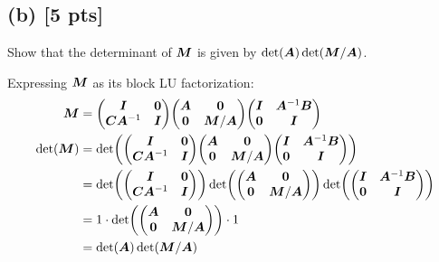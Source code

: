 \documentclass[twoside,10pt]{article}
\begin{document}
\subsection*{(b) [5 pts]} 
  Show that the determinant of $\bm{M}$ is given by $\det\left(\mtx{A}\right) \det\left(\mtx{M} / \mtx{A}\right)$.

  \quad Expressing $\bm{M}$ as its block LU factorization:
\begin{align*}
  \mtx{M} &= 
  \begin{pmatrix}
    \mtx{I} & \mtx{0} \\
    \mtx{C} \mtx{A}^{-1} & \mtx{I}
  \end{pmatrix}
  \begin{pmatrix}
    \mtx{A} & \mtx{0} \\
    \mtx{0} & \mtx{M} / \mtx{A}
  \end{pmatrix}
  \begin{pmatrix}
    \mtx{I} & \mtx{A}^{-1} \mtx{B} \\
    \mtx{0} & \mtx{I}
  \end{pmatrix}\\
  \det(\mtx{M}) &= 
  \det\left(\begin{pmatrix}
    \mtx{I} & \mtx{0} \\
    \mtx{C} \mtx{A}^{-1} & \mtx{I}
  \end{pmatrix}
  \begin{pmatrix}
    \mtx{A} & \mtx{0} \\
    \mtx{0} & \mtx{M} / \mtx{A}
  \end{pmatrix}
  \begin{pmatrix}
    \mtx{I} & \mtx{A}^{-1} \mtx{B} \\
    \mtx{0} & \mtx{I}
  \end{pmatrix}\right)\\
  &= \det\left(\begin{pmatrix}
    \mtx{I} & \mtx{0} \\
    \mtx{C} \mtx{A}^{-1} & \mtx{I}
  \end{pmatrix}\right)
  \det\left(\begin{pmatrix}
    \mtx{A} & \mtx{0} \\
    \mtx{0} & \mtx{M} / \mtx{A}
  \end{pmatrix}\right)
  \det\left(\begin{pmatrix}
    \mtx{I} & \mtx{A}^{-1} \mtx{B} \\
    \mtx{0} & \mtx{I}
  \end{pmatrix}\right)\\
  &= 1 \cdot 
  \det\left(\begin{pmatrix}
    \mtx{A} & \mtx{0} \\
    \mtx{0} & \mtx{M} / \mtx{A}
  \end{pmatrix}\right)
  \cdot 1\\
  &= 
  \det\left(\mtx{A}\right)\det\left(\mtx{M} / \mtx{A}\right)\\
\end{align*}
\end{document}
